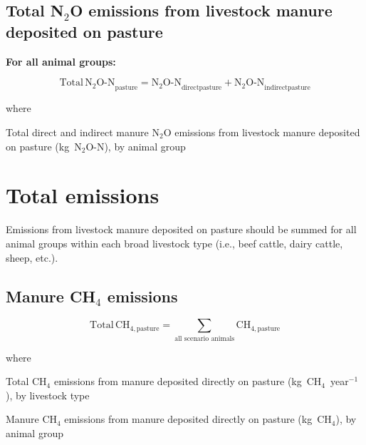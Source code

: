 \subsection{Total N\texorpdfstring{$_2$}{2}O emissions from livestock manure deposited on pasture}
\label{subsec:grazing-total-n2o}

\noindent\textbf{For all animal groups:}

\begin{equation}
    \mathrm{Total\,N_2O\text{-}N}_{\mathrm{pasture}}
        = \mathrm{N_2O\text{-}N}_{\mathrm{directpasture}}
          + \mathrm{N_2O\text{-}N}_{\mathrm{indirectpasture}}
    \tag{Eq.\ 5.4.6-1}
\end{equation}

\noindent where

\begin{description}[font=\normalfont, leftmargin=12em, style=nextline, nosep]
    \item[$\mathrm{Total\,N_2O\text{-}N}_{\mathrm{pasture}}$]
        Total direct and indirect manure N$_2$O emissions from livestock manure
        deposited on pasture (kg~N$_2$O-N), by animal group
\end{description}

\section{Total emissions}
\label{sec:grazing-total-emissions}

Emissions from livestock manure deposited on pasture should be summed for all
animal groups within each broad livestock type (i.e., beef cattle, dairy cattle,
sheep, etc.).

\subsection{Manure CH\texorpdfstring{$_4$}{4} emissions}
\label{subsec:grazing-total-ch4}

\begin{equation}
    \mathrm{Total\,CH_{4,\mathrm{pasture}}}
        = \sum_{\text{all scenario animals}} \mathrm{CH_{4,\mathrm{pasture}}}
    \tag{Eq.\ 5.5.1-1}
\end{equation}

\noindent where

\begin{description}[font=\normalfont, leftmargin=12em, style=nextline, nosep]
    \item[$\mathrm{Total\,CH_{4,\mathrm{pasture}}}$]
        Total CH$_4$ emissions from manure deposited directly on pasture
        (kg~CH$_4$~year$^{-1}$), by livestock type
    \item[$\mathrm{CH_{4,\mathrm{manure}}}$]
        Manure CH$_4$ emissions from manure deposited directly on pasture
        (kg~CH$_4$), by animal group
\end{description}

